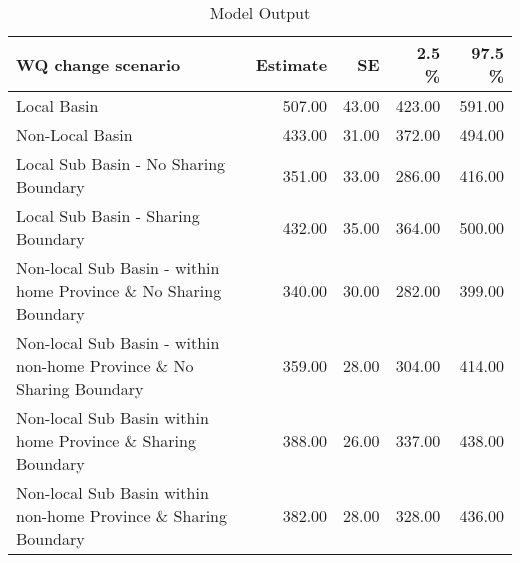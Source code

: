 \begin{table}[ht]
\centering
\begin{tabular}{lrrrr}
  \hline
WQ change scenario & Estimate & SE & 2.5 \% & 97.5 \% \\ 
  \hline
Local Basin & 507.00 & 43.00 & 423.00 & 591.00 \\ 
  Non-Local Basin & 433.00 & 31.00 & 372.00 & 494.00 \\ 
  Local Sub Basin - No Sharing Boundary & 351.00 & 33.00 & 286.00 & 416.00 \\ 
  Local Sub Basin - Sharing Boundary & 432.00 & 35.00 & 364.00 & 500.00 \\ 
  Non-local Sub Basin - within home Province \& No Sharing Boundary & 340.00 & 30.00 & 282.00 & 399.00 \\ 
  Non-local Sub Basin - within non-home Province \& No Sharing Boundary & 359.00 & 28.00 & 304.00 & 414.00 \\ 
  Non-local Sub Basin within home Province \& Sharing Boundary & 388.00 & 26.00 & 337.00 & 438.00 \\ 
  Non-local Sub Basin within non-home Province \& Sharing Boundary & 382.00 & 28.00 & 328.00 & 436.00 \\ 
   \hline
\end{tabular}
\caption{Model Output} 
\end{table}
